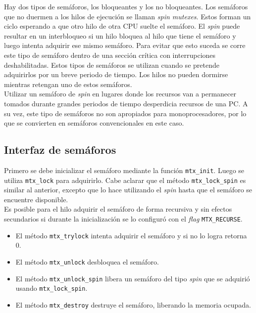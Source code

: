 \documentclass[a4paper]{book}
\begin{document}
Hay dos tipos de semáforos, los bloqueantes y los no bloqueantes. Los semáforos que no duermen a los hilos de ejecución se llaman \emph{spin mutexes}. Estos forman un ciclo esperando a que otro hilo de otra CPU suelte el semáforo. El \emph{spin} puede resultar en un interbloqueo si un hilo bloquea al hilo que tiene el semáforo y luego intenta adquirir ese mismo semáforo. Para evitar que esto suceda se corre este tipo de semáforo dentro de una sección crítica con interrupciones deshabilitadas. Estos tipos de semáforos se utilizan cuando se pretende adquirirlos por un breve periodo de tiempo. Los hilos no pueden dormirse mientras retengan uno de estos semáforos.\\

Utilizar un semáforo de \emph{spin} en lugares donde los recursos van a permanecer tomados durante grandes periodos de tiempo desperdicia recursos de una PC. A su vez, este tipo de semáforos no son apropiados para monoprocesadores, por lo que se convierten en semáforos convencionales en este caso.\\

\subsection{Interfaz de sem\'aforos}

Primero se debe inicializar el semáforo mediante la función \verb|mtx_init|. Luego se utiliza \verb|mtx_lock| para adquirirlo. Cabe aclarar que el método \verb|mtx_lock_spin| es similar al anterior, excepto que lo hace utilizando el \emph{spin} hasta que el semáforo se encuentre disponible.\\

Es posible para el hilo adquirir el semáforo de forma recursiva y sin efectos secundarios si durante la inicialización se lo configuró con el \emph{flag} \verb|MTX_RECURSE|.

\begin{itemize}
\item El método \verb|mtx_trylock| intenta adquirir el semáforo y si no lo logra retorna 0.
\item El método \verb|mtx_unlock| desbloquea el semáforo.
\item El método \verb|mtx_unlock_spin| libera un semáforo del tipo \emph{spin} que se adquirió usando \verb|mtx_lock_spin|.
\item El método \verb|mtx_destroy| destruye el semáforo, liberando la memoria ocupada.
\end{itemize}
\end{document}
